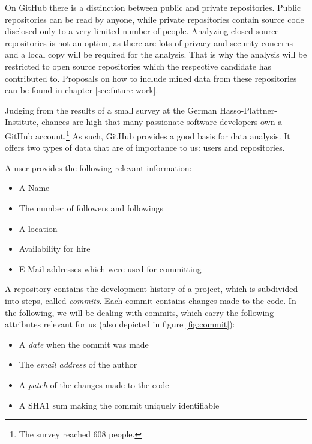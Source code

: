 On GitHub there is a distinction between public and private repositories. Public repositories can be read by anyone, while private repositories contain source code disclosed only to a very limited number of people. Analyzing closed source repositories is not an option, as there are lots of privacy and security concerns and a local copy will be required for the analysis. That is why the analysis will be restricted to open source repositories which the respective candidate has contributed to. Proposals on how to include mined data from these repositories can be found in chapter \ref{sec:future-work}.
\newline


Judging from the results of a small survey at the German Hasso-Plattner-Institute, chances are high that many passionate software developers own a GitHub account.\footnote{The survey reached 608 people.}
As such, GitHub provides a  good basis for data analysis. It offers two types of data that are of importance to us: users and repositories.
\newline

A user provides the following relevant information:
\begin{itemize}
  \item A Name
  \item The number of followers and followings
  \item A location
  \item Availability for hire
  \item E-Mail addresses which were used for committing
\end{itemize}
\vspace{1em}

\noindent A repository contains the development history of a project, which is subdivided into steps, called \textit{commits}. Each commit contains changes made to the code. In the following, we will be dealing with commits, which carry the following attributes relevant for us (also depicted in figure \ref{fig:commit}):

\begin{itemize}
    \item A \textit{date} when the commit was made
    \item The \textit{email address} of the author
    \item A \textit{patch} of the changes made to the code
    \item A SHA1 sum making the commit uniquely identifiable
\end{itemize}


